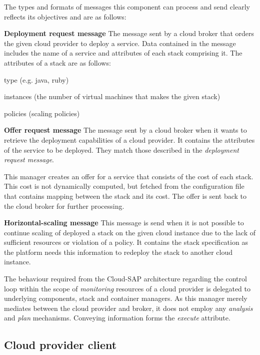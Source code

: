 The types and formats of messages this component can process and send clearly reflects its objectives and are as follows:
\begin{asparaenum}
\item[\textbf{Deployment request message}] The message sent by a cloud broker that orders the given cloud provider to deploy a service. Data contained in the message includes the name of a service and attributes of each stack comprising it. The attributes of a stack are as follows:
  \begin{compactitem}
  \item type (e.g. java, ruby)
  \item instances (the number of virtual machines that makes the given stack)
  \item policies (scaling policies)
  \end{compactitem}
\item[\textbf{Offer request message}] The message sent by a cloud broker when it wants to retrieve the deployment capabilities of a cloud provider. It contains the attributes of the service to be deployed. They match those described in the \emph{deployment request message}.

  This manager creates an offer for a service that consists of the cost of each stack. This cost is not dynamically computed, but fetched from the configuration file that contains mapping between the stack and its cost. The offer is sent back to the cloud broker for further processing.
\item[\textbf{Horizontal-scaling message}] This message is send when it is not possible to continue scaling of deployed a stack on the given cloud instance due to the lack of sufficient resources or violation of a policy. It contains the stack specification as the platform needs this information to redeploy the stack to another cloud instance.
\end{asparaenum}

The behaviour required from the Cloud-SAP architecture regarding the control loop within the scope of \emph{monitoring} resources of a cloud provider is delegated to underlying components, stack and container managers. As this manager merely mediates between the cloud provider and broker, it does not employ any \emph{analysis} and \emph{plan} mechanisms. Conveying information forms the \emph{execute} attribute.

\subsection{Cloud provider client}
